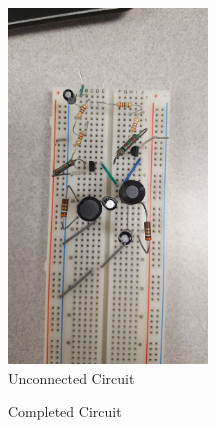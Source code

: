 \documentclass{article}
\begin{document}
\begin{figure}[h]
\begin{center}
\includegraphics[width=200px]{DisconnectedCircuit-min.jpg}
\caption{Unconnected Circuit}
\end{center}
\end{figure}

\begin{figure}[h]
\begin{center}
\qquad \qquad \qquad
{}
\caption{Completed Circuit}
\end{center}
\end{figure}
\end{document}
